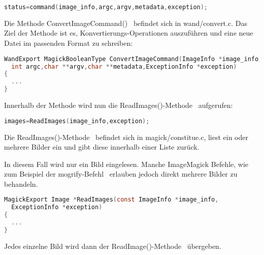 \begin{lstlisting}[firstnumber=172, language=C, caption=wand/migrify.c Aufruf des ConvertImageCommand,label={lst:lstlisting}]
status=command(image_info,argc,argv,metadata,exception);
\end{lstlisting}
\vspace{5mm}


Die Methode ConvertImageCommand()~\cite{DeklarationConvertIMageCommand} befindet sich in wand/convert.c. Das Ziel der Methode ist es, Konvertierungs-Operationen auszuführen und eine neue Datei im passenden Format zu schreiben:

\begin{lstlisting}[firstnumber=498, language=C, caption=wand/convert.c ConvertImageCommand(),label={lst:lstlisting}]
WandExport MagickBooleanType ConvertImageCommand(ImageInfo *image_info,
  int argc,char **argv,char **metadata,ExceptionInfo *exception)
{
  ...
}
\end{lstlisting}
\vspace{5mm}

Innerhalb der Methode wird nun die ReadImages()-Methode~\cite{AufrufReadImages} aufgerufen:

\begin{lstlisting}[firstnumber=628, language=C, caption=wand/convert.c Aufruf ReadImages(),label={lst:lstlisting}]
  images=ReadImages(image_info,exception);
\end{lstlisting}
\vspace{5mm}

Die ReadImages()-Methode~\cite{DeklarationReadImages} befindet sich in magick/constitue.c,
liest ein oder mehrere Bilder ein und gibt diese innerhalb einer Liste zurück.

\newpage

In diesem Fall wird nur ein Bild eingelesen.
Manche ImageMagick Befehle, wie zum Beispiel der mogrify-Befehl~\cite{MogrifyCommand} erlauben jedoch direkt mehrere Bilder zu behandeln.

\begin{lstlisting}[firstnumber=790, language=C, caption=magick/constitute.c ReadImages(),label={lst:lstlisting}]
MagickExport Image *ReadImages(const ImageInfo *image_info,
  ExceptionInfo *exception)
{
  ...
}
\end{lstlisting}
\vspace{5mm}

Jedes einzelne Bild wird dann der ReadImage()-Methode~\cite{DeklarationReadImage} übergeben.\\

